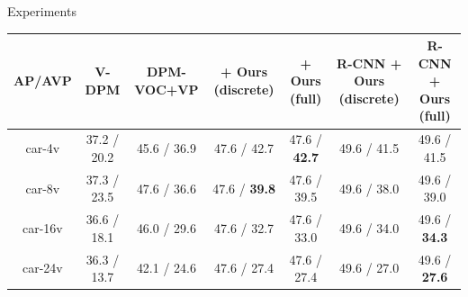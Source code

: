 \documentclass[serif,mathserif,final]{beamer}
\newcommand{\1}{\mathbb{I}} %
\begin{document}
\begin{frame}{}
\begin{columns}[t]
\begin{column}{0.23\linewidth}
\begin{block}{Experiments}
\begin{table}[t]
\begin{center}
    \begin{tabular}{|c||c||c||c|c||c|c|}
    \hline
    AP/AVP              & V-DPM \cite{Xiang14} & DPM-VOC+VP \cite{Pepik12}  & \cite{Pepik12} + Ours (discrete) & \cite{Pepik12} + Ours (full) & R-CNN + Ours (discrete) & R-CNN + Ours (full)\\
    \hline\hline
    car-4v              & 37.2 / 20.2         & 45.6 / 36.9             & 47.6 / 42.7       & 47.6 / \textbf{42.7}        & 49.6 / 41.5         & 49.6 / 41.5\\ \hline
    car-8v              & 37.3 / 23.5         & 47.6 / 36.6             & 47.6 / \textbf{39.8}       & 47.6 / 39.5        & 49.6 / 38.0         & 49.6 / 39.0\\ \hline
    car-16v             & 36.6 / 18.1         & 46.0 / 29.6             & 47.6 / 32.7       & 47.6 / 33.0        & 49.6 / 34.0         & 49.6 / \textbf{34.3}\\ \hline
    car-24v             & 36.3 / 13.7         & 42.1 / 24.6             & 47.6 / 27.4       & 47.6 / 27.4        & 49.6 / 27.0         & 49.6 / \textbf{27.6}\\ \hline
    \hline

\end{tabular}
\end{center}
\end{table}
\end{block}
\end{column}
\end{columns}
\end{frame}
\end{document}
